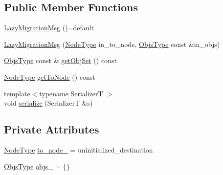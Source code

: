 \subsection*{Public Member Functions}
\begin{DoxyCompactItemize}
\item 
\hyperlink{structvt_1_1vrt_1_1collection_1_1balance_1_1_lazy_migration_msg_a05c45988e43b726f0792e8fb43183036}{Lazy\+Migration\+Msg} ()=default
\item 
\hyperlink{structvt_1_1vrt_1_1collection_1_1balance_1_1_lazy_migration_msg_aa63fe960ff146d67756b83b5e7d529e9}{Lazy\+Migration\+Msg} (\hyperlink{namespacevt_a866da9d0efc19c0a1ce79e9e492f47e2}{Node\+Type} in\+\_\+to\+\_\+node, \hyperlink{structvt_1_1vrt_1_1collection_1_1balance_1_1_lazy_migration_msg_a8d71e0015ee1e05da54701cae56ef31c}{Objs\+Type} const \&in\+\_\+objs)
\item 
\hyperlink{structvt_1_1vrt_1_1collection_1_1balance_1_1_lazy_migration_msg_a8d71e0015ee1e05da54701cae56ef31c}{Objs\+Type} const  \& \hyperlink{structvt_1_1vrt_1_1collection_1_1balance_1_1_lazy_migration_msg_ada6a86ba4aa7b806a9088f4ad395458d}{get\+Obj\+Set} () const
\item 
\hyperlink{namespacevt_a866da9d0efc19c0a1ce79e9e492f47e2}{Node\+Type} \hyperlink{structvt_1_1vrt_1_1collection_1_1balance_1_1_lazy_migration_msg_a94b5564dd7432421519a7e07bfa535c5}{get\+To\+Node} () const
\item 
{\footnotesize template$<$typename SerializerT $>$ }\\void \hyperlink{structvt_1_1vrt_1_1collection_1_1balance_1_1_lazy_migration_msg_a58b2680d2acf6ab6da98d421c21f3e20}{serialize} (SerializerT \&s)
\end{DoxyCompactItemize}
\subsection*{Private Attributes}
\begin{DoxyCompactItemize}
\item 
\hyperlink{namespacevt_a866da9d0efc19c0a1ce79e9e492f47e2}{Node\+Type} \hyperlink{structvt_1_1vrt_1_1collection_1_1balance_1_1_lazy_migration_msg_a2faa91a88b04f980a8e74d921cebfb14}{to\+\_\+node\+\_\+} = uninitialized\+\_\+destination
\item 
\hyperlink{structvt_1_1vrt_1_1collection_1_1balance_1_1_lazy_migration_msg_a8d71e0015ee1e05da54701cae56ef31c}{Objs\+Type} \hyperlink{structvt_1_1vrt_1_1collection_1_1balance_1_1_lazy_migration_msg_aebb8293a1833db126d75d2ec570bb591}{objs\+\_\+} = \{\}
\end{DoxyCompactItemize}
